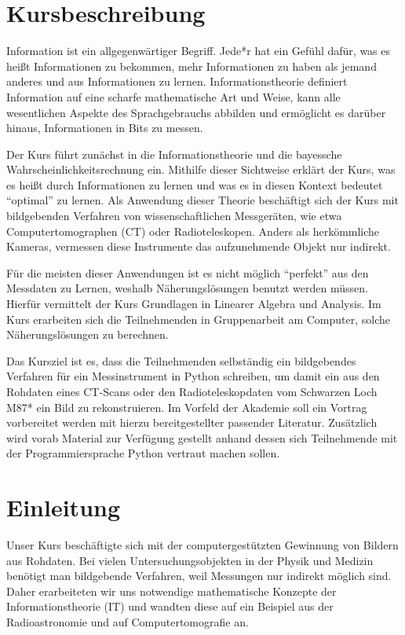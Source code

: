 \section*{Kursbeschreibung}
Information ist ein allgegenwärtiger Begriff. Jede*r hat ein Gefühl dafür, was es heißt Informationen zu bekommen, mehr Informationen zu haben als jemand anderes und aus Informationen zu lernen.
Informationstheorie definiert Information auf eine scharfe mathematische Art und Weise, kann alle wesentlichen Aspekte des Sprachgebrauchs abbilden und ermöglicht es darüber hinaus, Informationen in Bits zu messen.

Der Kurs führt zunächst in die Informationstheorie und die bayessche Wahrscheinlichkeitsrechnung ein.
Mithilfe dieser Sichtweise erklärt der Kurs, was es heißt durch Informationen zu lernen und was es in diesen Kontext bedeutet \enquote{optimal} zu lernen.
Als Anwendung dieser Theorie beschäftigt sich der Kurs mit bildgebenden Verfahren von wissenschaftlichen Messgeräten, wie etwa Computertomographen (CT) oder Radioteleskopen.
Anders als herkömmliche Kameras, vermessen diese Instrumente das aufzunehmende Objekt nur indirekt.

Für die meisten dieser Anwendungen ist es nicht möglich \enquote{perfekt} aus den Messdaten zu Lernen, weshalb Näherungslösungen benutzt werden müssen.
Hierfür vermittelt der Kurs Grundlagen in Linearer Algebra und Analysis.
Im Kurs erarbeiten sich die Teilnehmenden in Gruppenarbeit am Computer, solche Näherungslösungen zu berechnen.

Das Kursziel ist es, dass die Teilnehmenden selbständig ein bildgebendes Verfahren für ein Messinstrument in Python schreiben, um damit ein aus den Rohdaten eines CT-Scans oder den Radioteleskopdaten vom Schwarzen Loch M87* ein Bild zu rekonstruieren.
Im Vorfeld der Akademie soll ein Vortrag vorbereitet werden mit hierzu bereitgestellter passender Literatur.
Zusätzlich wird vorab Material zur Verfügung gestellt anhand dessen sich Teilnehmende mit der Programmiersprache Python vertraut machen sollen.

\section{Einleitung}

Unser Kurs beschäftigte sich mit der computergestützten Gewinnung von Bildern aus Rohdaten.
Bei vielen Untersuchungsobjekten in der Physik und Medizin benötigt man bildgebende Verfahren, weil Messungen nur indirekt möglich sind.
Daher erarbeiteten wir uns notwendige mathematische Konzepte der Informationstheorie (IT) und wandten diese auf ein Beispiel aus der Radioastronomie und auf Computertomografie an.

